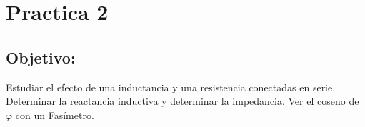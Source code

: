 \documentclass[spanish,openany]{report}
\date{\today}
\begin{document}

%
%
%




\section*{Practica 2}
\subsection*{Objetivo:}
Estudiar el efecto de una inductancia y una resistencia conectadas en serie. 
Determinar la reactancia inductiva y determinar la impedancia. Ver el coseno de $\varphi $ con un Fasímetro.
\end{document}
